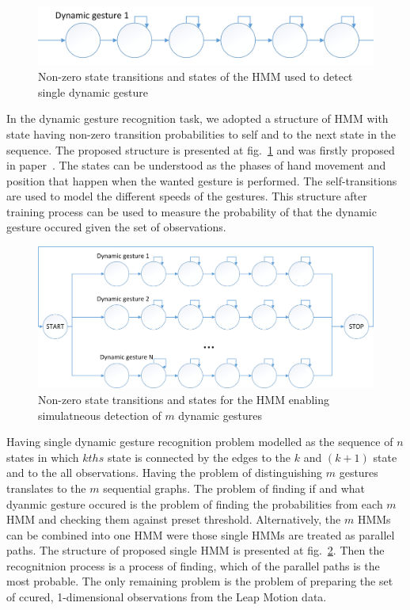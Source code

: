 \begin{figure}[htb]
\centering
 \includegraphics[width=1\columnwidth]{figures/SingleHMM.png}
 \caption{Non-zero state transitions and states of the HMM used to detect single dynamic gesture}
 \label{singlehmm}
\end{figure}

In the dynamic gesture recognition task, we adopted a structure of HMM with state having non-zero transition probabilities to self and to the next state in the sequence.
The proposed structure is presented at fig.~\ref{singlehmm} and was firstly proposed in paper~\cite{hmm}.
The states can be understood as the phases of hand movement and position that happen when the wanted gesture is performed.
The self-transitions are used to model the different speeds of the gestures.
This structure after training process can be used to measure the probability of that the dynamic gesture occured given the set of observations.

\begin{figure}[htb]
\centering
 \includegraphics[width=1\columnwidth]{figures/HMM_eng.png}
 \caption{Non-zero state transitions and states for the HMM enabling simulatneous detection of $m$ dynamic gestures}
 \label{HMMstructure}
\end{figure}

Having single dynamic gesture recognition problem modelled as the sequence of $n$ states in which $kths$ state is connected by the edges to the $k$ and $(k+1)$ state and to the all observations.
Having the problem of distinguishing $m$ gestures translates to the $m$ sequential graphs.
The problem of finding if and what dyanmic gesture occured is the problem of finding the probabilities from each $m$ HMM and checking them against preset threshold.
Alternatively, the $m$ HMMs can be combined into one HMM were those single HMMs are treated as parallel paths.
The structure of proposed single HMM is presented at fig.~\ref{HMMstructure}.
Then the recognitnion process is a process of finding, which of the parallel paths is the most probable.
The only remaining problem is the problem of preparing the set of ccured, 1-dimensional observations from the Leap Motion data.

